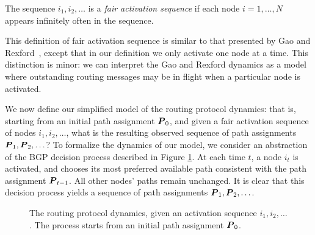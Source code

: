 \begin{defn}
The sequence $i_1, i_2, \ldots$ is a {\em fair activation
sequence} if each node $i = 1,\ldots,N$ appears infinitely often in
the sequence.
\end{defn}

This definition of fair activation sequence is similar to that presented
by Gao and Rexford~\cite{Gao2001a}, except that in our
definition we only 
activate one node at a time.  This distinction is minor: we can
interpret the Gao and Rexford dynamics as a model where 
outstanding routing messages may be in flight when a particular node is
activated.

We now define our simplified model of the routing protocol dynamics: that
is, starting from an initial path assignment $\boldsymbol{P}_0$, and given a
fair activation sequence of nodes $i_1, i_2,\ldots$, what is the
resulting observed sequence of path assignments $\boldsymbol{P}_1, \boldsymbol{P}_2,
\ldots$?  To formalize the dynamics of our model, we consider an
abstraction of the 
BGP decision process described in Figure \ref{fig:bgpdec}.  At each
time $t$, a node $i_t$ is activated, and chooses its most preferred available
path consistent with the path assignment $\boldsymbol{P}_{t-1}$.  All other
nodes' paths remain unchanged.  It is clear that this decision process
yields a sequence of path assignments $\boldsymbol{P}_1, \boldsymbol{P}_2,
\ldots$.

\begin{figure}
\caption[Model of the routing protocol dynamics]{The routing protocol
  dynamics, given an activation sequence $i_1, 
i_2, \ldots$.  The process starts from an initial path assignment $\boldsymbol{P}_0$.}
\label{fig:bgpdec}
\end{figure}


